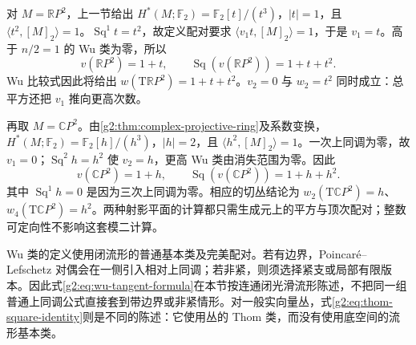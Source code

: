 \begin{example}\label{g2:exm:projective-plane-wu-classes}
	对 \(M=\mathbb RP^2\)，上一节给出 \(H^*(M;\mathbb F_2)=\mathbb F_2[t]/(t^3)\)，\(|t|=1\)，且 \(\langle t^2,[M]_2\rangle=1\)。\(\operatorname{Sq}^1t=t^2\)，故定义配对要求 \(\langle v_1t,[M]_2\rangle=1\)，于是 \(v_1=t\)。高于 \(n/2=1\) 的 Wu 类为零，所以
	\[
		v(\mathbb RP^2)=1+t,\qquad
		\operatorname{Sq}(v(\mathbb RP^2))=1+t+t^2.
	\]
	Wu 比较式因此将给出 \(w(\mathrm T\mathbb RP^2)=1+t+t^2\)。\(v_2=0\) 与 \(w_2=t^2\) 同时成立：总平方还把 \(v_1\) 推向更高次数。

	再取 \(M=\mathbb CP^2\)。由\cref{g2:thm:complex-projective-ring}及系数变换，\(H^*(M;\mathbb F_2)=\mathbb F_2[h]/(h^3)\)，\(|h|=2\)，且 \(\langle h^2,[M]_2\rangle=1\)。一次上同调为零，故 \(v_1=0\)；\(\operatorname{Sq}^2h=h^2\) 使 \(v_2=h\)，更高 Wu 类由消失范围为零。因此
	\[
		v(\mathbb CP^2)=1+h,\qquad
		\operatorname{Sq}(v(\mathbb CP^2))=1+h+h^2.
	\]
	其中 \(\operatorname{Sq}^1h=0\) 是因为三次上同调为零。相应的切丛结论为 \(w_2(\mathrm T\mathbb CP^2)=h\)、\(w_4(\mathrm T\mathbb CP^2)=h^2\)。两种射影平面的计算都只需生成元上的平方与顶次配对；整数可定向性不影响这套模二计算。
\end{example}

Wu 类的定义使用闭流形的普通基本类及完美配对。若有边界，Poincaré--Lefschetz 对偶会在一侧引入相对上同调；若非紧，则须选择紧支或局部有限版本。因此式\eqref{g2:eq:wu-tangent-formula}在本节按连通闭光滑流形陈述，不把同一组普通上同调公式直接套到带边界或非紧情形。对一般实向量丛，式\eqref{g2:eq:thom-square-identity}则是不同的陈述：它使用丛的 Thom 类，而没有使用底空间的流形基本类。
